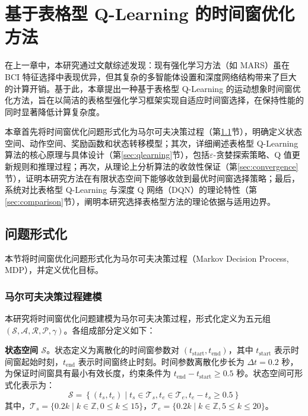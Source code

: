 
\chapter{基于表格型 Q-Learning 的时间窗优化方法}
\label{chap:method}

在上一章中，本研究通过文献综述发现：现有强化学习方法（如 MARS）虽在 BCI 特征选择中表现优异，但其复杂的多智能体设置和深度网络结构带来了巨大的计算开销。基于此，本章提出一种基于表格型 Q-Learning 的运动想象时间窗优化方法，旨在以简洁的表格型强化学习框架实现自适应时间窗选择，在保持性能的同时显著降低计算复杂度。

本章首先将时间窗优化问题形式化为马尔可夫决策过程（第\ref{sec:formulation}节），明确定义状态空间、动作空间、奖励函数和状态转移模型；其次，详细阐述表格型 Q-Learning 算法的核心原理与具体设计（第\ref{sec:qlearning}节），包括$\varepsilon$-贪婪探索策略、Q 值更新规则和推理过程；再次，从理论上分析算法的收敛性保证（第\ref{sec:convergence}节），证明本研究方法在有限状态空间下能够收敛到最优时间窗选择策略；最后，系统对比表格型 Q-Learning 与深度 Q 网络（DQN）的理论特性（第\ref{sec:comparison}节），阐明本研究选择表格型方法的理论依据与适用边界。

\section{问题形式化}
\label{sec:formulation}

本节将时间窗优化问题形式化为马尔可夫决策过程（Markov Decision Process, MDP），并定义优化目标。

\subsection{马尔可夫决策过程建模}
\label{subsec:mdp}

本研究将时间窗优化问题建模为马尔可夫决策过程，形式化定义为五元组 $(\mathcal{S}, \mathcal{A}, \mathcal{R}, \mathcal{P}, \gamma)$。各组成部分定义如下：

\textbf{状态空间 $\mathcal{S}$}。状态定义为离散化的时间窗参数对 $(t_{\text{start}}, t_{\text{end}})$，其中 $t_{\text{start}}$ 表示时间窗起始时刻，$t_{\text{end}}$ 表示时间窗终止时刻。时间参数离散化步长为 $\Delta t = 0.2$ 秒，为保证时间窗具有最小有效长度，约束条件为 $t_{\text{end}} - t_{\text{start}} \geq 0.5$ 秒。状态空间可形式化表示为：
\begin{equation}
\mathcal{S} = \left\{ (t_s, t_e) \mid t_s \in \mathcal{T}_s, t_e \in \mathcal{T}_e, t_e - t_s \geq 0.5 \right\}
\end{equation}
其中，$\mathcal{T}_s = \{0.2k \mid k \in \mathbb{Z}, 0 \leq k \leq 15\}$，$\mathcal{T}_e = \{0.2k \mid k \in \mathbb{Z}, 5 \leq k \leq 20\}$。

